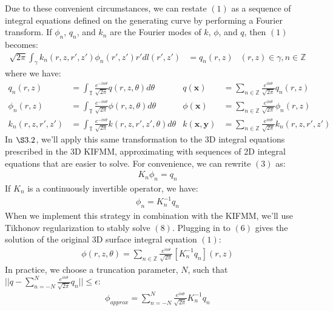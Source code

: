 \documentclass[11pt, oneside]{article}   	%
\begin{document}
Due to these convenient circumstances, we can restate $(1)$ as a sequence of integral equations defined on the generating curve by performing a Fourier transform. If $\phi_n$, $q_n$, and $k_n$ are the Fourier modes of $k$, $\phi$, and $q$, then $(1)$ becomes:
\begin{align}
\sqrt{2\pi}\int_\gamma k_n(r,z,r',z')\phi_n(r',z')r'dl(r',z')&=q_n(r,z) &(r,z)\in\gamma, n\in\mathbb{Z}
\end{align}
where we have:
\begin{align}
q_n(r,z)&=\int_\mathbb{T}\frac{e^{-in\theta}}{\sqrt{2\pi}}q(r,z,\theta)d\theta&q(\mathbf{x})&=\sum_{n\in\mathbb{Z}}\frac{e^{in\theta}}{\sqrt{2\pi}}q_n(r,z)\\
\phi_n(r,z)&=\int_\mathbb{T}\frac{e^{-in\theta}}{\sqrt{2\pi}}\phi(r,z,\theta)d\theta&\phi(\mathbf{x})&=\sum_{n\in\mathbb{Z}}\frac{e^{in\theta}}{\sqrt{2\pi}}\phi_n(r,z)\\
k_n(r,z,r',z')&=\int_\mathbb{T}\frac{e^{-in\theta}}{\sqrt{2\pi}}k(r,z,r',z',\theta)d\theta&k(\mathbf{x},\mathbf{y})&=\sum_{n\in\mathbb{Z}}\frac{e^{in\theta}}{\sqrt{2\pi}}k_n(r,z,r',z')
\end{align}
In $\S3.2$, we'll apply this same transformation to the 3D integral equations prescribed in the 3D KIFMM, approximating with sequences of 2D integral equations that are easier to solve. For convenience, we can rewrite $(3)$ as:
\begin{align}
K_n\phi_n=q_n
\end{align}
If $K_n$ is a continuously invertible operator, we have:
\begin{align}
\phi_n=K_n^{-1}q_n
\end{align}
When we implement this strategy in combination with the KIFMM, we'll use Tikhonov regularization to stably solve $(8)$. Plugging in to $(6)$ gives the solution of the original 3D surface integral equation $(1)$:
\begin{align}
\phi(r,z,\theta)=\sum_{n\in\mathbb{Z}}\frac{e^{in\theta}}{\sqrt{2\pi}}[K_n^{-1}q_n](r,z)
\end{align}
In practice, we choose a truncation parameter, $N$, such that $||q-\sum\limits_{n=-N}^{N}\frac{e^{in\theta}}{\sqrt{2\pi}}q_n||\le\epsilon$:
\begin{align}
\phi_{approx}=\sum_{n=-N}^N\frac{e^{in\theta}}{\sqrt{2\pi}}K_n^{-1}q_n
\end{align}
\end{document}
